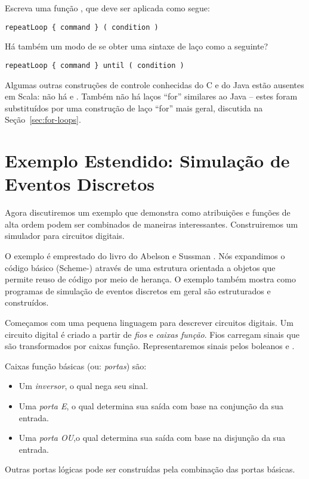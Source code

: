 \begin{exercise} Escreva uma função , que deve ser aplicada como segue:
\begin{lstlisting}
repeatLoop { command } ( condition )
\end{lstlisting}
Há também um modo de se obter uma sintaxe de laço como a seguinte?
\begin{lstlisting}
repeatLoop { command } until ( condition )
\end{lstlisting}
\end{exercise}

Algumas outras construções de controle conhecidas do C e do Java estão ausentes em Scala: não há  e 
. Também não há laços ``for'' similares ao Java -- estes foram substituídos por uma construção 
de laço ``for'' mais geral, discutida na Seção~\ref{sec:for-loops}.

\section{Exemplo Estendido: Simulação de Eventos Discretos}
Agora discutiremos um exemplo que demonstra como atribuições e funções de alta ordem podem ser combinados
de maneiras interessantes. Construiremos um simulador para circuitos digitais.

O exemplo é emprestado do livro do Abelson e
Sussman \cite{abelson-sussman:structure}.  Nós expandimos o código
básico (Scheme-) através de uma estrutura orientada a objetos que
permite reuso de código por meio de herança. O exemplo também mostra
como programas de simulação de eventos discretos em geral são
estruturados e construídos.

Começamos com uma pequena linguagem para descrever circuitos digitais. Um circuito digital é criado a partir
de {\em fios} e {\em caixas função}. Fios carregam sinais que são transformados por caixas função. 
Representaremos sinais pelos boleanos  e .

Caixas função básicas (ou: {\em portas}) são: 

\begin{itemize}
\item Um \emph{inversor}, o qual nega seu sinal.
\item Uma \emph{porta E}, o qual determina sua saída com base na conjunção da sua entrada.
\item Uma \emph{porta OU},o qual determina sua saída com base na disjunção da sua entrada.
\end{itemize}
Outras portas lógicas pode ser construídas pela combinação das portas básicas.

